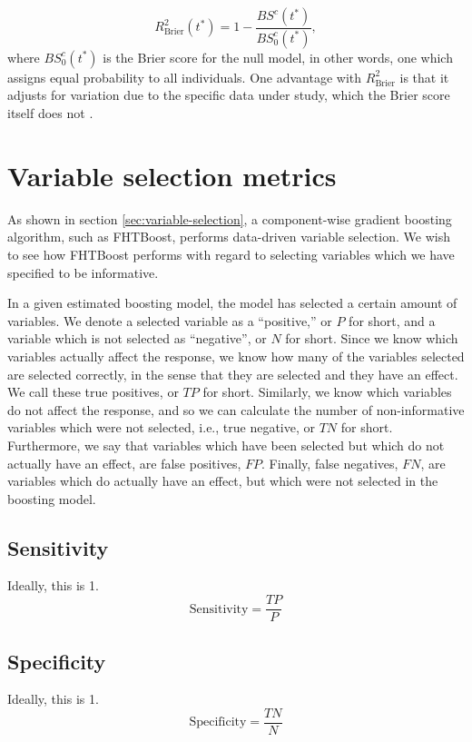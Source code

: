\begin{equation*}
    R^2_{\text{Brier}}(t^*)=1-\frac{BS^c(t^*)}{BS^c_0(t^*)},
\end{equation*}
where $BS^c_0(t^*)$ is the Brier score for the null model, in other words, one which assigns equal probability to all individuals. One advantage with $R^2_{\text{Brier}}$ is that it adjusts for variation due to the specific data under study, which the Brier score itself does not \citep{bovelstadborgan}.

\section{Variable selection metrics}
As shown in section \eqref{sec:variable-selection}, a component-wise gradient boosting algorithm, such as FHTBoost,
performs data-driven variable selection.
We wish to see how FHTBoost performs with regard to selecting variables which we have specified to be informative.

In a given estimated boosting model, the model has selected a certain amount of variables.
We denote a selected variable as a ``positive,'' or $P$ for short, and a variable which is not selected as ``negative'', or $N$ for short.
Since we know which variables actually affect the response, we know how many of the variables selected are selected correctly, in the sense
that they are selected and they have an effect. We call these true positives, or $TP$ for short.
Similarly, we know which variables do not affect the response, and so we can calculate the number of non-informative variables
which were not selected, i.e., true negative, or $TN$ for short. Furthermore, we say that variables which have been selected
but which do not actually have an effect, are false positives, $FP$. Finally, false negatives, $FN$, are variables which do actually
have an effect, but which were not selected in the boosting model.

\subsection{Sensitivity}
Ideally, this is 1.
\begin{equation}\label{eq:sensitivity}
    \text{Sensitivity}=\frac{TP}{P}
\end{equation}

\subsection{Specificity}
Ideally, this is 1.
\begin{equation}\label{eq:specificity}
    \text{Specificity}=\frac{TN}{N}
\end{equation}

